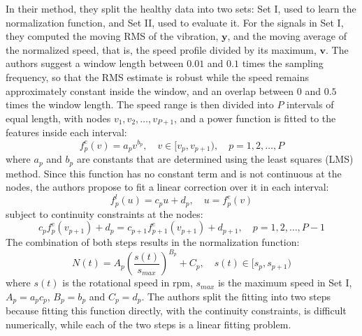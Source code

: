 In their method, they split the healthy data into two sets: Set I, used to learn the normalization function, and Set II, used to evaluate it. For the signals in Set I, they computed the moving RMS of the vibration, $\mathbf{y}$, and the moving average of the normalized speed, that is, the speed profile divided by its maximum, $\mathbf{v}$. The authors suggest a window length between $0.01$ and $0.1$ times the sampling frequency, so that the RMS estimate is robust while the speed remains approximately constant inside the window, and an overlap between $0$ and $0.5$ times the window length. The speed range is then divided into $P$ intervals of equal length, with nodes $v_1, v_2, \dots, v_{P+1}$, and a power function is fitted to the features inside each interval:
\begin{equation}
    f_p^e(v) = a_p v^{b_p}, \quad v \in [v_p, v_{p+1}), \quad p = 1, 2, \dots, P
\end{equation}
where $a_p$ and $b_p$ are constants that are determined using the least squares (LMS) method. Since this function has no constant term and is not continuous at the nodes, the authors propose to fit a linear correction over it in each interval:
\begin{equation}
    f_p^l(u) = c_p u + d_p, \quad u = f_p^e(v)
\end{equation}
subject to continuity constraints at the nodes:
\begin{equation}
    c_p f_p^e(v_{p+1}) + d_p = c_{p+1} f_{p+1}^e(v_{p+1}) + d_{p+1}, \quad p = 1, 2, \dots, P - 1
\end{equation}
The combination of both steps results in the normalization function:
\begin{equation}
    N(t) = A_p \left(\frac{s(t)}{s_{max}}\right)^{B_p} + C_p, \quad s(t) \in [s_p, s_{p+1})
\end{equation}
where $s(t)$ is the rotational speed in rpm, $s_{max}$ is the maximum speed in Set I, $A_p = a_p c_p$, $B_p = b_p$ and $C_p = d_p$. The authors split the fitting into two steps because fitting this function directly, with the continuity constraints, is difficult numerically, while each of the two steps is a linear fitting problem.

